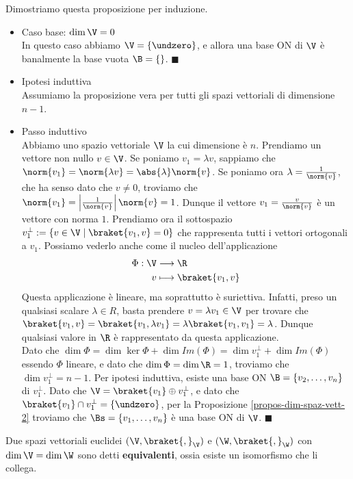 \documentclass[11pt, a4paper, titlepage, oneside]{scrbook}
\begin{document}
Dimostriamo questa proposizione per induzione. 
\begin{itemize}
    \item Caso base: $\dim \V = 0$ \\
    In questo caso abbiamo $\V = \{\undzero\}$, e allora una base ON di $\V$ è banalmente la base vuota $\B = \{\}$. $\blacksquare$
    \item Ipotesi induttiva \\
    Assumiamo la proposizione vera per tutti gli spazi vettoriali di dimensione $n-1$.
    \item Passo induttivo \\
    Abbiamo uno spazio vettoriale $\V$ la cui dimensione è $n$. Prendiamo un vettore non nullo $v \in \V$. Se poniamo $v_1 = \lambda v$, sappiamo che \mbox{$\norm{v_1} = \norm{\lambda v} = \abs{\lambda} \norm{v}$}. Se poniamo ora $\lambda = \frac{1}{\norm{v}}$, che ha senso dato che $v \neq 0$, troviamo che \mbox{$\norm{v_1} = \left|{\frac{1}{\norm{v}}}\right| \norm{v} = 1$}. Dunque il vettore $v_1 = \frac{v}{\norm{v}}$ è un vettore con norma $1$. Prendiamo ora il sottospazio $v_1^\perp := \{v \in \V \mid \braket{v_1, v} = 0\}$ che rappresenta tutti i vettori ortogonali a $v_1$. Possiamo vederlo anche come il nucleo dell'applicazione
    \begin{align*}
    \Phi: \V &\longrightarrow \R \\
    v &\longmapsto \braket{v_1,v}
    \end{align*}
    Questa applicazione è lineare, ma soprattutto è suriettiva. Infatti, preso un qualsiasi scalare $\lambda \in R$, basta prendere $v = \lambda v_1 \in \V$ per trovare che $\braket{v_1, v} = \braket{v_1, \lambda v_1} = \lambda \braket{v_1, v_1} = \lambda$. Dunque qualsiasi valore in $\R$ è rappresentato da questa applicazione. \\
    Dato che $\dim \Phi = \dim \ker \Phi + \dim Im(\Phi) = \dim v_1^\perp + \dim Im(\Phi)$ essendo $\Phi$ lineare, e dato che $\dim \Phi = \dim \R = 1$, troviamo che $\dim v_1^\perp = n - 1$. Per ipotesi induttiva, esiste una base ON $\B = \{v_2, \ldots, v_n\}$ di $v_1^\perp$. Dato che $\V = \braket{v_1} \oplus v_1^\perp$, e dato che $\braket{v_1} \cap v_1^\perp = \{\undzero\}$, per la Proposizione \ref{propos-dim-spaz-vett-2} troviamo che $\Bs = \{v_1, \ldots, v_n\}$ è una base ON di $\V$. $\blacksquare$
\end{itemize}

\begin{Definizione}
\label{def-spazi-vettoriali-euclidei-equivalenti}
Due spazi vettoriali euclidei $(\V, \braket{,}_\V)$ e $(\W, \braket{,}_\W)$ con $\dim \V = \dim \W$ sono detti \textbf{equivalenti}, ossia esiste un isomorfismo che li collega.
\end{Definizione}
\end{document}
